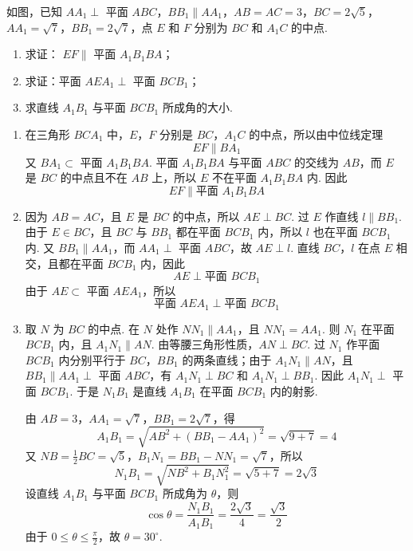 \begin{problem}
如图，已知 \(AA_{1} \perp\) 平面 \(ABC\)，\(BB_{1} \parallel AA_{1}\)，\(AB = AC = 3\)，\(BC = 2\sqrt{5}\)，\(AA_{1} = \sqrt{7}\)，\(BB_{1} = 2\sqrt{7}\)，点 \(E\) 和 \(F\) 分别为 \(BC\) 和 \(A_{1}C\) 的中点.

\begin{enumerate}
\item 求证： \(EF \parallel\) 平面 \(A_{1}B_{1}BA\)；
\item 求证：平面 \( AEA_{1} \perp \) 平面 \(BCB_{1}\)；
\item 求直线 \(A_{1}B_{1}\) 与平面 \(BCB_{1}\) 所成角的大小.
\end{enumerate}

\end{problem}

\begin{solution}
\begin{enumerate}
\item 在三角形 \(BCA_1\) 中，\(E\)，\(F\) 分别是 \(BC\)，\(A_1C\) 的中点，所以由中位线定理
\[
EF\parallel BA_1
\]
又 \(BA_1\subset\) 平面 \(A_1B_1BA\). 平面 \(A_1B_1BA\) 与平面 \(ABC\) 的交线为 \(AB\)，而 \(E\) 是 \(BC\) 的中点且不在 \(AB\) 上，所以 \(E\) 不在平面 \(A_1B_1BA\) 内. 因此
\[
EF\parallel\text{平面 }A_1B_1BA
\]

\item 因为 \(AB=AC\)，且 \(E\) 是 \(BC\) 的中点，所以 \(AE\perp BC\). 过 \(E\) 作直线 \(l\parallel BB_1\). 由于 \(E\in BC\)，且 \(BC\) 与 \(BB_1\) 都在平面 \(BCB_1\) 内，所以 \(l\) 也在平面 \(BCB_1\) 内. 又 \(BB_1\parallel AA_1\)，而 \(AA_1\perp\) 平面 \(ABC\)，故 \(AE\perp l\). 直线 \(BC\)，\(l\) 在点 \(E\) 相交，且都在平面 \(BCB_1\) 内，因此
\[
AE\perp\text{平面 }BCB_1
\]
由于 \(AE\subset\) 平面 \(AEA_1\)，所以
\[
\text{平面 }AEA_1\perp\text{平面 }BCB_1
\]

\item 取 \(N\) 为 \(BC\) 的中点. 在 \(N\) 处作 \(NN_1\parallel AA_1\)，且 \(NN_1=AA_1\). 则 \(N_1\) 在平面 \(BCB_1\) 内，且 \(A_1N_1\parallel AN\). 由等腰三角形性质，\(AN\perp BC\). 过 \(N_1\) 作平面 \(BCB_1\) 内分别平行于 \(BC\)，\(BB_1\) 的两条直线；由于 \(A_1N_1\parallel AN\)，且 \(BB_1\parallel AA_1\perp\) 平面 \(ABC\)，有 \(A_1N_1\perp BC\) 和 \(A_1N_1\perp BB_1\). 因此 \(A_1N_1\perp\) 平面 \(BCB_1\). 于是 \(N_1B_1\) 是直线 \(A_1B_1\) 在平面 \(BCB_1\) 内的射影.

由 \(AB=3\)，\(AA_1=\sqrt7\)，\(BB_1=2\sqrt7\)，得
\[
A_1B_1=\sqrt{AB^2+(BB_1-AA_1)^2}=\sqrt{9+7}=4
\]
又 \(NB=\frac12BC=\sqrt5\)，\(B_1N_1=BB_1-NN_1=\sqrt7\)，所以
\[
N_1B_1=\sqrt{NB^2+B_1N_1^2}=\sqrt{5+7}=2\sqrt3
\]
设直线 \(A_1B_1\) 与平面 \(BCB_1\) 所成角为 \(\theta\)，则
\[
\cos\theta=\frac{N_1B_1}{A_1B_1}=\frac{2\sqrt3}{4}=\frac{\sqrt3}{2}
\]
由于 \(0\leqslant\theta\leqslant\frac\pi2\)，故 \(\theta=30^\circ\).
\end{enumerate}
\end{solution}

